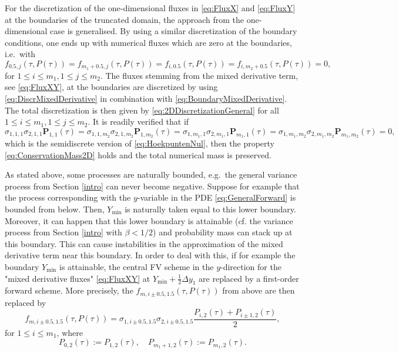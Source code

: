 \documentclass[10pt]{article}
\begin{document}
For the discretization of the one-dimensional fluxes in \eqref{eq:FluxX} and \eqref{eq:FluxY} at the boundaries of the truncated domain, the approach from the one-dimensional case is generalised. By using a similar discretization of the boundary conditions, one ends up with numerical fluxes which are zero at the boundaries, i.e.\ with
$$ f_{0.5,j}(\tau,P(\tau)) = f_{m_{1}+0.5,j}(\tau,P(\tau)) = f_{i,0.5}(\tau,P(\tau)) = f_{i,m_{2} + 0.5}(\tau,P(\tau)) = 0, $$
for $1 \leq i \le m_{1}, 1 \le j \le m_{2}$.
The fluxes stemming from the mixed derivative term, see \eqref{eq:FluxXY}, at the boundaries are discretized by using \eqref{eq:DiscrMixedDerivative} in combination with \eqref{eq:BoundaryMixedDerivative}. 
The total discretization is then given by \eqref{eq:2DDiscretizationGeneral} for all $1 \le i \le m_{1}, 1 \le j \le m_{2}$.
It is readily verified that if
$$ \sigma_{1,1,1} \sigma_{2,1,1} \boldsymbol{P}_{1,1}(\tau) = \sigma_{1,1,m_{2}} \sigma_{2,1,m_{2}} \boldsymbol{P}_{1,m_{2}}(\tau) = \sigma_{1,m_{1},1} \sigma_{2,m_{1},1} \boldsymbol{P}_{m_{1},1}(\tau) = \sigma_{1,m_{1},m_{2}} \sigma_{2,m_{1},m_{2}} \boldsymbol{P}_{m_{1},m_{2}}(\tau)=0, $$
which is the semidiscrete version of \eqref{eq:HoekpuntenNul}, then the property \eqref{eq:ConservationMass2D} holds and the total numerical mass is preserved.

As stated above, some processes are naturally bounded, e.g.\ the general variance process from Section \ref{intro} can never become negative. 
Suppose for example that the process corresponding with the $y$-variable in the PDE \eqref{eq:GeneralForward} is bounded from below. Then, $Y_{\min}$ is naturally taken equal to this lower boundary. Moreover, it can happen that this lower boundary is attainable (cf. the variance process from Section \ref{intro} with $\beta < 1/2$) and probability mass can stack up at this boundary. This can cause instabilities in the approximation of the mixed derivative term near this boundary. In order to deal with this, if for example the boundary $Y_{\min}$ is attainable, the central FV scheme in the $y$-direction for the "mixed derivative fluxes" \eqref{eq:FluxXY} at $Y_{\min}+\tfrac{1}{2}\Delta y_{1}$ are replaced by a first-order forward scheme. More precisely, the $f_{m,i \pm 0.5, 1.5}(\tau,P(\tau))$ from above are then replaced by
$$ f_{m,i \pm 0.5, 1.5}(\tau,P(\tau)) =  \sigma_{1,i\pm0.5,1.5}\sigma_{2,i\pm0.5,1.5} \frac{P_{i,2}(\tau)+P_{i \pm 1,2}(\tau)}{2}, $$
for $1 \leq i \leq m_{1}$, where
$$ P_{0,2}(\tau) := P_{1,2}(\tau), \quad P_{m_{1}+1,2}(\tau) := P_{m_{1},2}(\tau). $$  
\end{document}
